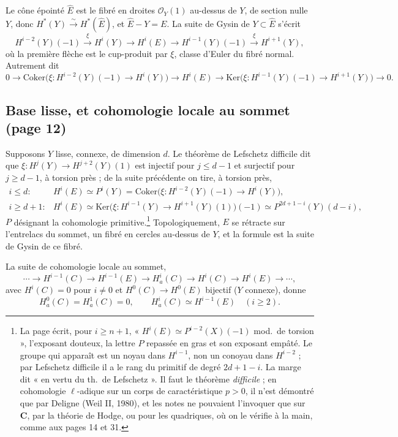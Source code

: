 \documentclass[11pt,a4paper]{article}
\begin{document}
Le cône épointé $\widehat{E}$ est le fibré en droites $\mathcal{O}_{Y}(1)$
au-dessus de $Y$, de section nulle $Y$, donc
$H^{*}(Y) \xrightarrow{\sim} H^{*}(\widehat{E})$, et
$\widehat{E} - Y = E$. La suite de Gysin de $Y \subset \widehat{E}$ s'écrit
\[
  H^{i-2}(Y)(-1) \xrightarrow{\ \xi\ } H^{i}(Y) \to H^{i}(E) \to
  H^{i-1}(Y)(-1) \xrightarrow{\ \xi\ } H^{i+1}(Y),
\]
où la première flèche est le cup-produit par $\xi$, classe d'Euler du
fibré normal. Autrement dit
\[
  0 \to \mathrm{Coker}\bigl(\xi : H^{i-2}(Y)(-1) \to H^{i}(Y)\bigr) \to H^{i}(E)
  \to \mathrm{Ker}\bigl(\xi : H^{i-1}(Y)(-1) \to H^{i+1}(Y)\bigr) \to 0 .
\]

\subsection*{Base lisse, et cohomologie locale au sommet (page 12)}

Supposons $Y$ lisse, connexe, de dimension $d$. Le théorème de Lefschetz
difficile dit que $\xi : H^{j}(Y) \to H^{j+2}(Y)(1)$ est injectif pour
$j \leq d - 1$ et surjectif pour $j \geq d - 1$, à torsion près ; de la
suite précédente on tire, à torsion près,
\[
  \begin{array}{ll}
    i \leq d : & H^{i}(E) \simeq P^{i}(Y) = \mathrm{Coker}\bigl(\xi : H^{i-2}(Y)(-1) \to H^{i}(Y)\bigr), \\[4pt]
    i \geq d + 1 : & H^{i}(E) \simeq \mathrm{Ker}\bigl(\xi : H^{i-1}(Y) \to H^{i+1}(Y)(1)\bigr)(-1)
      \simeq P^{2d+1-i}(Y)(d-i),
  \end{array}
\]
$P$ désignant la cohomologie primitive.\footnote{La page écrit, pour
$i \geq n + 1$, « $H^{i}(E) \simeq P^{i-2}(X)(-1)$ mod.\ de
torsion », l'exposant douteux, la lettre $P$ repassée en gras et son exposant empâté. Le
groupe qui apparaît est un noyau dans $H^{i-1}$, non un conoyau dans
$H^{i-2}$ ; par Lefschetz difficile il a le rang du primitif de degré
$2d + 1 - i$. La marge dit « en vertu du th.\ de Lefschetz ». Il faut
le théorème \emph{difficile} ; en cohomologie $\ell$-adique sur un corps de
caractéristique $p > 0$, il n'est démontré que par Deligne (Weil II, 1980),
et les notes ne pouvaient l'invoquer que sur $\mathbf{C}$, par la théorie
de Hodge, ou pour les quadriques, où on le vérifie à la main, comme aux
pages 14 et 31.} Topologiquement, $E$ se rétracte sur l'entrelacs du sommet,
un fibré en cercles au-dessus de $Y$, et la formule est la suite de Gysin
de ce fibré.

La suite de cohomologie locale au sommet,
\[
  \cdots \to H^{i-1}(C) \to H^{i-1}(E) \to H^{i}_{a}(C) \to H^{i}(C) \to
  H^{i}(E) \to \cdots,
\]
avec $H^{i}(C) = 0$ pour $i \neq 0$ et $H^{0}(C) \to H^{0}(E)$ bijectif
($Y$ connexe), donne
\[
  H^{0}_{a}(C) = H^{1}_{a}(C) = 0, \qquad
  H^{i}_{a}(C) \simeq H^{i-1}(E) \quad (i \geq 2) .
\]
\end{document}
